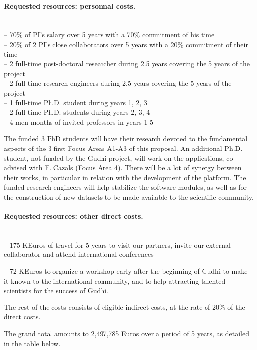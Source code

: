 \paragraph{Requested resources: personnal costs.}\mbox{}\\
-- 70\% of PI's salary over 5 years with a 70\% commitment of his time\\
-- 20\% of 2 PI's close collaborators over 5 years with a 20\% commitment of their time\\
-- 2 full-time post-doctoral researcher during 2.5 years covering the 5 years of the project\\
-- 2 full-time research engineers during 2.5 years covering the 5 years of the project\\
-- 1 full-time Ph.D. student during years 1, 2, 3\\
-- 2 full-time Ph.D. students during years 2, 3, 4\\
-- 4 men-months of invited professors in years 1-5.

The funded 3 PhD students will have their research devoted to the fundamental aspects of the 3 first Focus Areas A1-A3 of this proposal. An additional Ph.D. student, not funded by the Gudhi project, will work on the applications, co-advised with F. Cazals  (Focus Area 4). There will be a lot of synergy between their works, in particular in relation with the development of the platform. The funded research engineers  will help stabilize the software modules, as well as for the construction of new datasets to be made available to the scientific community.

\paragraph{Requested resources: other direct costs.}\mbox{}\\
-- 175 KEuros of travel for 5 years to visit our partners, invite our external collaborator and attend international conferences

-- 72 KEuros to organize a workshop early after the beginning of Gudhi to make it known to the international community, and to help attracting talented scientists for the success of Gudhi.

The rest of the costs consists of eligible indirect costs, at the rate of 20\% of the direct costs.

The grand total amounts to 2,497,785 Euros over a period of 5 years, as detailed in the table below.



